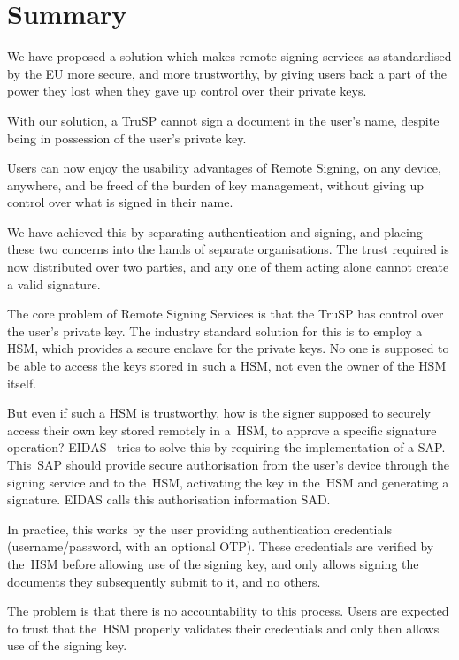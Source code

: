 \chapter*{Summary}
We have proposed a solution which makes remote signing services as standardised by the \gls{EU} more secure,
and more trustworthy,
by giving users back a part of the power they lost when they gave up control over their private keys.

With our solution,
a \gls{TruSP} cannot sign a document in the user's name,
despite being in possession of the user's private key.

Users can now enjoy the usability advantages of Remote Signing,
on any device, anywhere,
and be freed of the burden of key management,
without giving up control over what is signed in their name.

We have achieved this by separating authentication and signing,
and placing these two concerns into the hands of separate organisations.
The trust required is now distributed over two parties,
and any one of them acting alone cannot create a valid signature.

The core problem of Remote Signing Services is that the \gls{TruSP} has control over the user's private key.
The industry standard solution for this is to employ a \gls{HSM},
which provides a secure enclave for the private keys.
No one is supposed to be able to access the keys stored in such a \gls{HSM},
not even the owner of the \gls{HSM} itself.

But even if such a \gls{HSM} is trustworthy,
how is the signer supposed to securely access their own key stored remotely in a~\gls{HSM},
to approve a specific signature operation? EIDAS~\cite{eidas} tries to solve this by requiring the implementation of a \gls{SAP}.
This~\gls{SAP} should provide secure authorisation from the user's device through the signing service and to the~\gls{HSM},
activating the key in the~\gls{HSM} and generating a signature.
EIDAS calls this authorisation information \gls{SAD}.

In practice,
this works by the user providing authentication credentials (username/password, with an optional \gls{OTP}).
These credentials are verified by the~\gls{HSM} before allowing use of the signing key,
and only allows signing the documents they subsequently submit to it, and no others.

The problem is that there is no accountability to this process.
Users are expected to trust that the~\gls{HSM} properly validates their credentials and only then
allows use of the signing key.

